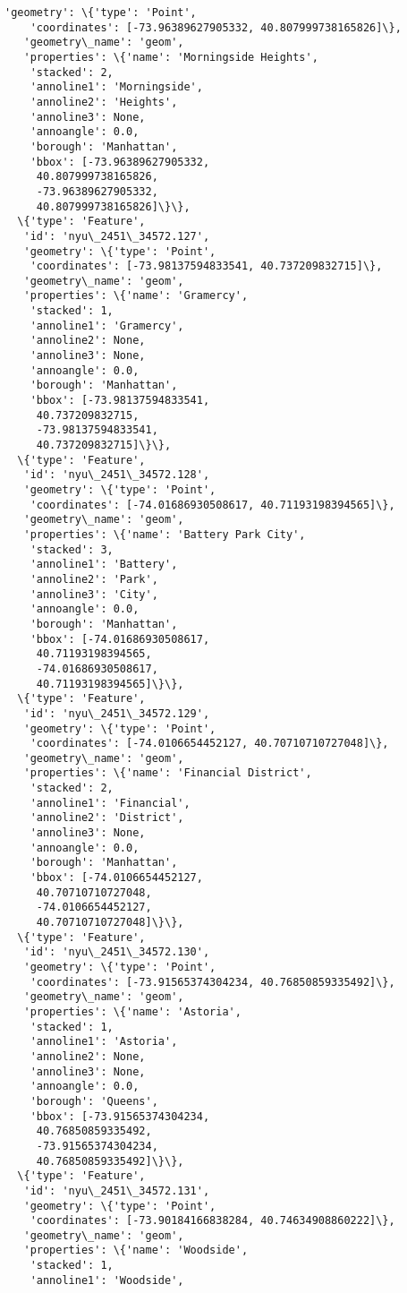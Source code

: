 \documentclass[11pt]{article}
\begin{document}
\begin{tcolorbox}[breakable, size=fbox, boxrule=.5pt, pad at break*=1mm, opacityfill=0]
\begin{Verbatim}[commandchars=\\\{\}]
   'geometry': \{'type': 'Point',
    'coordinates': [-73.96389627905332, 40.807999738165826]\},
   'geometry\_name': 'geom',
   'properties': \{'name': 'Morningside Heights',
    'stacked': 2,
    'annoline1': 'Morningside',
    'annoline2': 'Heights',
    'annoline3': None,
    'annoangle': 0.0,
    'borough': 'Manhattan',
    'bbox': [-73.96389627905332,
     40.807999738165826,
     -73.96389627905332,
     40.807999738165826]\}\},
  \{'type': 'Feature',
   'id': 'nyu\_2451\_34572.127',
   'geometry': \{'type': 'Point',
    'coordinates': [-73.98137594833541, 40.737209832715]\},
   'geometry\_name': 'geom',
   'properties': \{'name': 'Gramercy',
    'stacked': 1,
    'annoline1': 'Gramercy',
    'annoline2': None,
    'annoline3': None,
    'annoangle': 0.0,
    'borough': 'Manhattan',
    'bbox': [-73.98137594833541,
     40.737209832715,
     -73.98137594833541,
     40.737209832715]\}\},
  \{'type': 'Feature',
   'id': 'nyu\_2451\_34572.128',
   'geometry': \{'type': 'Point',
    'coordinates': [-74.01686930508617, 40.71193198394565]\},
   'geometry\_name': 'geom',
   'properties': \{'name': 'Battery Park City',
    'stacked': 3,
    'annoline1': 'Battery',
    'annoline2': 'Park',
    'annoline3': 'City',
    'annoangle': 0.0,
    'borough': 'Manhattan',
    'bbox': [-74.01686930508617,
     40.71193198394565,
     -74.01686930508617,
     40.71193198394565]\}\},
  \{'type': 'Feature',
   'id': 'nyu\_2451\_34572.129',
   'geometry': \{'type': 'Point',
    'coordinates': [-74.0106654452127, 40.70710710727048]\},
   'geometry\_name': 'geom',
   'properties': \{'name': 'Financial District',
    'stacked': 2,
    'annoline1': 'Financial',
    'annoline2': 'District',
    'annoline3': None,
    'annoangle': 0.0,
    'borough': 'Manhattan',
    'bbox': [-74.0106654452127,
     40.70710710727048,
     -74.0106654452127,
     40.70710710727048]\}\},
  \{'type': 'Feature',
   'id': 'nyu\_2451\_34572.130',
   'geometry': \{'type': 'Point',
    'coordinates': [-73.91565374304234, 40.76850859335492]\},
   'geometry\_name': 'geom',
   'properties': \{'name': 'Astoria',
    'stacked': 1,
    'annoline1': 'Astoria',
    'annoline2': None,
    'annoline3': None,
    'annoangle': 0.0,
    'borough': 'Queens',
    'bbox': [-73.91565374304234,
     40.76850859335492,
     -73.91565374304234,
     40.76850859335492]\}\},
  \{'type': 'Feature',
   'id': 'nyu\_2451\_34572.131',
   'geometry': \{'type': 'Point',
    'coordinates': [-73.90184166838284, 40.74634908860222]\},
   'geometry\_name': 'geom',
   'properties': \{'name': 'Woodside',
    'stacked': 1,
    'annoline1': 'Woodside',

\end{Verbatim}
\end{tcolorbox}
\end{document}
